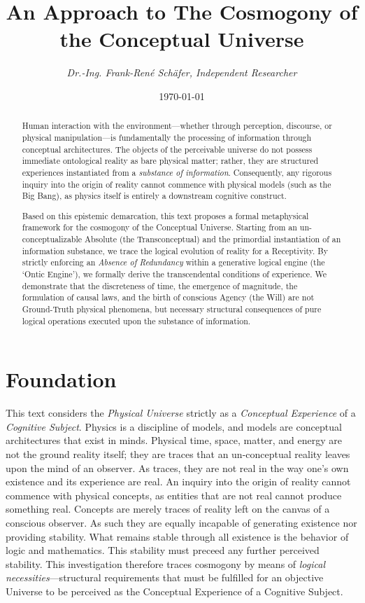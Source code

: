 \documentclass[11pt, a4paper]{article}
\title{\textbf{An Approach to The Cosmogony of the Conceptual Universe}}
\author{\textit{Dr.-Ing. Frank-René Schäfer, Independent Researcher}}
\date{\today}
\theoremstyle{formalism}
\begin{document}
\maketitle

\begin{abstract}

Human interaction with the environment---whether through perception, discourse,
or physical manipulation---is fundamentally the processing of information through
conceptual architectures. The objects of the perceivable universe do not possess
immediate ontological reality as bare physical matter; rather, they are structured
experiences instantiated from a \textit{substance of information}. Consequently,
any rigorous inquiry into the origin of reality cannot commence with physical
models (such as the Big Bang), as physics itself is entirely a downstream
cognitive construct. 

Based on this epistemic demarcation, this text proposes a formal metaphysical
framework for the cosmogony of the Conceptual Universe. Starting from an
un-conceptualizable Absolute (the Transconceptual) and the primordial instantiation of
an information substance, we trace the logical evolution of reality for a Receptivity.
By strictly enforcing an \textit{Absence of Redundancy} within a
generative logical engine (the `Ontic Engine'), we formally derive the transcendental
conditions of experience. We demonstrate that the discreteness of time, the
emergence of magnitude, the formulation of causal laws, and the birth of conscious
Agency (the Will) are not Ground-Truth physical phenomena, but necessary structural
consequences of pure logical operations executed upon the substance of information.

\end{abstract}

\section{Foundation}

This text considers the \textit{Physical Universe} strictly as a
\textit{Conceptual Experience} of a \textit{Cognitive Subject}. Physics is a
discipline of models, and models are conceptual architectures that exist in
minds. Physical time, space, matter, and energy are not the ground reality
itself; they are traces that an un-conceptual reality leaves upon the mind of
an observer. As traces, they are not real in the way one's own existence and
its experience are real. An inquiry into the origin of reality cannot commence
with physical concepts, as entities that are not real cannot produce something
real. Concepts are merely traces of reality left on the canvas of a conscious
observer. As such they are equally incapable of generating existence nor
providing stability. What remains stable through all existence is the behavior
of logic and mathematics. This stability must preceed any further perceived
stability. This investigation therefore traces cosmogony by
means of \textit{logical necessities}---structural requirements that must be
fulfilled for an objective Universe to be perceived as the Conceptual
Experience of a Cognitive Subject. 
\end{document}
